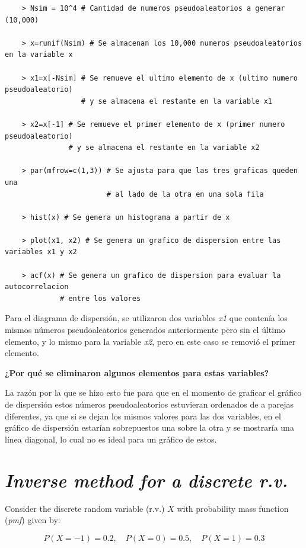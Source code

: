\documentclass[12pt]{article}
\begin{document}
\begin{lstlisting}
    > Nsim = 10^4 # Cantidad de numeros pseudoaleatorios a generar (10,000)
    
    > x=runif(Nsim) # Se almacenan los 10,000 numeros pseudoaleatorios en la variable x 
    
    > x1=x[-Nsim] # Se remueve el ultimo elemento de x (ultimo numero pseudoaleatorio)
                  # y se almacena el restante en la variable x1
                  
    > x2=x[-1] # Se remueve el primer elemento de x (primer numero pseudoaleatorio)
               # y se almacena el restante en la variable x2
               
    > par(mfrow=c(1,3)) # Se ajusta para que las tres graficas queden una 
                        # al lado de la otra en una sola fila

    > hist(x) # Se genera un histograma a partir de x

    > plot(x1, x2) # Se genera un grafico de dispersion entre las variables x1 y x2

    > acf(x) # Se genera un grafico de dispersion para evaluar la autocorrelacion 
             # entre los valores
\end{lstlisting}


Para el diagrama de dispersión, se utilizaron dos variables \textit{x1} que contenía los mismos números pseudoaleatorios generados anteriormente pero sin el último elemento, y lo mismo para la variable \textit{x2}, pero en este caso se removió el primer elemento.

\textbf{¿Por qué se eliminaron algunos elementos para estas variables?}

La razón por la que se hizo esto fue para que en el momento de graficar el gráfico de dispersión estos números pseudoaleatorios estuvieran ordenados de a parejas diferentes, ya que si se dejan los mismos valores para las dos variables, en el gráfico de dispersión estarían sobrepuestos una sobre la otra y se mostraría una línea diagonal, lo cual no es ideal para un gráfico de estos.


\section{\textit{Inverse method for a discrete r.v.}}

Consider the discrete random variable (r.v.) $X$ with probability mass function (\textit{pmf}) given by:

\[
P (X = -1) = 0.2, \quad P (X = 0) = 0.5, \quad P (X = 1) = 0.3
\]
\end{document}
